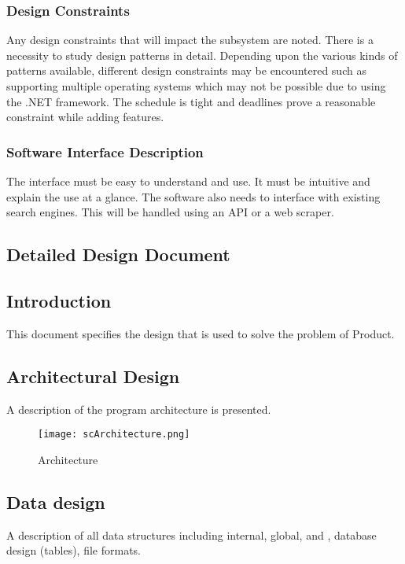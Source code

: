 \documentclass[10pt,a4paper]
{article}
\numberwithin{table}{section}
\begin{document}
{{\begin{normalsize}
\subsubsection{Design Constraints}	
\hspace*{0.3cm}Any design constraints that will impact the subsystem are noted. There is a necessity to study design patterns in detail. Depending upon the various kinds of patterns available, different design constraints may be encountered such as supporting multiple operating systems which may not be possible due to using the .NET framework. The schedule is tight and deadlines prove a reasonable constraint while adding features.

 \subsubsection{Software Interface Description}	 
\hspace*{0.3cm}The interface must be easy to understand and use. It must be intuitive and explain the use at a glance. The software also needs to interface with existing search engines. This will be handled using an API or a web scraper.

\newpage
\begin{center}
\begin{huge}
\section{Detailed Design Document}
\end{huge}
\end{center}
 \subsection{Introduction}  
This document specifies the design that is used to solve the problem of Product.  
\subsection{Architectural Design}  
	A description of the program architecture is presented.\\ 
\begin{figure}[h]
			\centering
			\texttt{[image: scArchitecture.png]}
			\caption{Architecture}
		\end{figure}

\newpage
\subsection{Data design}   
\hspace*{0.3cm}A description of all data structures including internal, global, and , database design (tables), file formats.

\end{normalsize}}}
\end{document}
